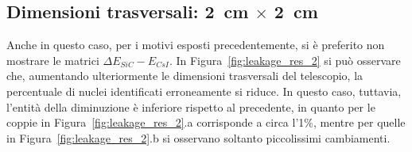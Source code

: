 \subsection*{Dimensioni trasversali: 2~cm $\times$ 2~cm}
Anche in questo caso, per i motivi esposti precedentemente, si è preferito non mostrare le matrici $\Delta E_{SiC} - E_{CsI}$.
In Figura~\ref{fig:leakage_res_2} si può osservare che, aumentando ulteriormente le dimensioni trasversali del telescopio, la percentuale di nuclei identificati erroneamente si riduce.
In questo caso, tuttavia, l'entità della diminuzione è inferiore rispetto al precedente, in quanto per le coppie in Figura~\ref{fig:leakage_res_2}.a corrisponde a circa l'1\%, mentre per quelle in Figura~\ref{fig:leakage_res_2}.b si osservano soltanto piccolissimi cambiamenti.


